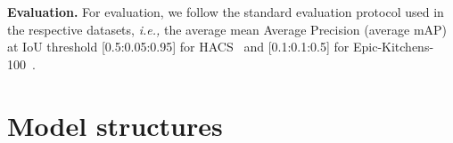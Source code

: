 \documentclass{article} \usepackage{iclr2022_conference,times}
\def\x{}
\begin{document}
\textbf{Evaluation.} For evaluation, we follow the standard evaluation protocol used in the respective datasets, \textit{i.e.,} the average mean Average Precision (average mAP) at IoU threshold [0.5:0.05:0.95] for HACS~\citep{hacs} and [0.1:0.1:0.5] for Epic-Kitchens-100~\citep{ek100}. 

\section{Model structures}
\label{appendix:modelstructure}
\newcommand{\blockrtd}[3]{\multirow{4}{*}{-.1em] \textbf{\textcolor{themeblue}{\text{3\x3, #2}}}\\x#3}
}
\newcommand{\blockrtpod}[3]{\multirow{4}{*}{-.1em] \textbf{\textcolor{themeblue}{\text{1\x3, #2}}}\-.1em]\text{1\x1, #1}\end{array}\right]\left[\begin{array}{c}\text{1\x1, #2}\-.1em] \text{1\x1, #1}\end{array}\right]\x#3}
}
\end{document}
